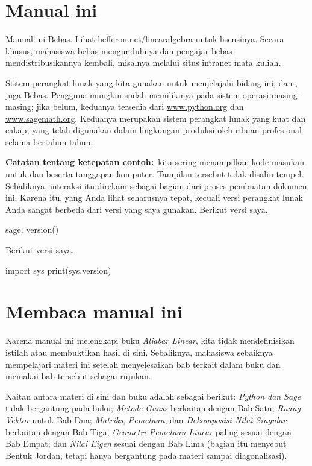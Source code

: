 \section{Manual ini}
Manual ini Bebas.
Lihat \url{hefferon.net/linearalgebra} untuk lisensinya.
Secara khusus, mahasiswa bebas mengunduhnya dan pengajar bebas
mendistribusikannya kembali, misalnya melalui situs intranet mata kuliah.


Sistem perangkat lunak yang kita gunakan untuk menjelajahi bidang ini,
\python{} dan \Sage{}, juga Bebas.
Pengguna mungkin sudah memilikinya pada sistem operasi masing-masing;
jika belum, keduanya tersedia dari
\href{http://www.python.org}{\url{www.python.org}}
dan
\href{https://www.sagemath.org}{\url{www.sagemath.org}}.
Keduanya merupakan sistem perangkat lunak yang kuat dan cakap, yang telah
digunakan dalam lingkungan produksi oleh ribuan profesional selama bertahun-tahun.

\textbf{Catatan tentang ketepatan contoh:}~kita sering menampilkan kode
masukan untuk \python{} dan \Sage{} beserta tanggapan komputer.
Tampilan tersebut tidak disalin-tempel.
Sebaliknya, interaksi itu direkam sebagai bagian dari proses pembuatan
dokumen ini. Karena itu, yang Anda lihat seharusnya tepat, kecuali versi
perangkat lunak Anda sangat berbeda dari versi yang saya gunakan.
Berikut versi \Sage{} saya.
\begin{sagecommandline}
sage: version()  
\end{sagecommandline}
Berikut versi \python{} saya.
\begin{pythonconsole}
import sys
print(sys.version)
\end{pythonconsole}




\section{Membaca manual ini}
Karena manual ini melengkapi buku \textit{Aljabar Linear}, kita tidak
mendefinisikan istilah atau membuktikan hasil di sini.
Sebaliknya, mahasiswa sebaiknya mempelajari materi ini setelah menyelesaikan
bab terkait dalam buku dan memakai bab tersebut sebagai rujukan.

Kaitan antara materi di sini dan buku adalah sebagai berikut:
\textit{Python dan Sage} tidak bergantung pada buku;
\textit{Metode Gauss} berkaitan dengan Bab Satu;
\textit{Ruang Vektor} untuk Bab Dua;
\textit{Matriks}, \textit{Pemetaan}, dan
\textit{Dekomposisi Nilai Singular} berkaitan dengan Bab Tiga;
\textit{Geometri Pemetaan Linear} paling sesuai dengan Bab Empat; dan
\textit{Nilai Eigen} sesuai dengan Bab Lima
(bagian itu menyebut Bentuk Jordan, tetapi hanya bergantung pada materi
sampai diagonalisasi).

